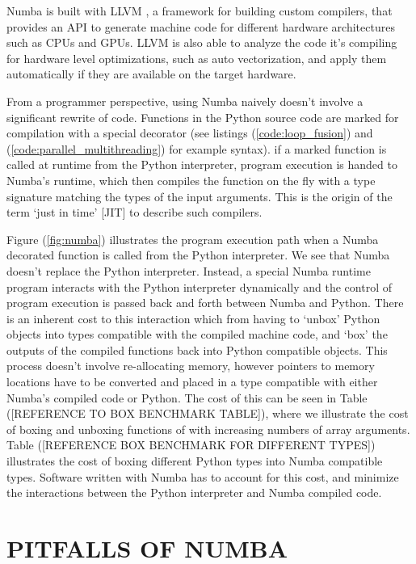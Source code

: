 \documentclass{IEEEcsmag}
\begin{document}
Numba is built with LLVM \cite{Lattner2004}, a framework for building custom compilers, that provides an API to generate machine code for different hardware architectures such as CPUs and GPUs. LLVM is also able to analyze the code it's compiling for hardware level optimizations, such as auto vectorization, and apply them automatically if they are available on the target hardware.

From a programmer perspective, using Numba naively doesn't involve a significant rewrite of code. Functions in the Python source code are marked for compilation with a special decorator (see listings (\ref{code:loop_fusion}) and (\ref{code:parallel_multithreading}) for example syntax). if a marked function is called at runtime from the Python interpreter, program execution is handed to Numba's runtime, which then compiles the function on the fly with a type signature matching the types of the input arguments. This is the origin of the term `just in time' [JIT] to describe such compilers.

Figure (\ref{fig:numba}) illustrates the program execution path when a Numba decorated function is called from the Python interpreter. We see that Numba doesn't replace the Python interpreter. Instead, a special Numba runtime program interacts with the Python interpreter dynamically and the control of program execution is passed back and forth between Numba and Python. There is an inherent cost to this interaction which from having to `unbox' Python objects into types compatible with the compiled machine code, and `box' the outputs of the compiled functions back into Python compatible objects. This process doesn't involve re-allocating memory, however pointers to memory locations have to be converted and placed in a type compatible with either Numba's compiled code or Python. The cost of this can be seen in Table ([REFERENCE TO BOX BENCHMARK TABLE]), where we illustrate the cost of boxing and unboxing functions of with increasing numbers of array arguments. Table ([REFERENCE BOX BENCHMARK FOR DIFFERENT TYPES]) illustrates the cost of boxing different Python types into Numba compatible types. Software written with Numba has to account for this cost, and minimize the interactions between the Python interpreter and Numba compiled code.



\section{PITFALLS OF NUMBA}
\end{document}
